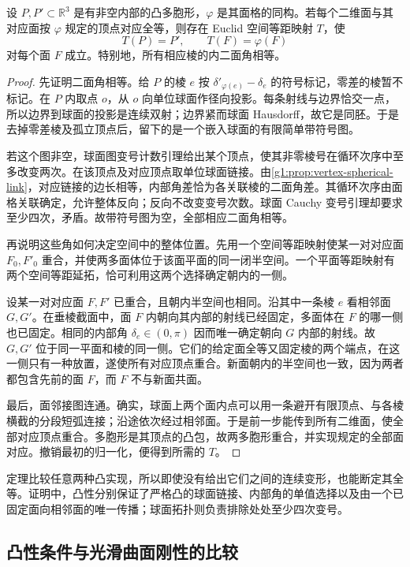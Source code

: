 \begin{theorem}\label{g1:thm:cauchy-convex-rigidity}
	设 \(P,P'\subset\mathbb R^3\) 是有非空内部的凸多胞形，\(\varphi\) 是其面格的同构。若每个二维面与其对应面按 \(\varphi\) 规定的顶点对应全等，则存在 Euclid 空间等距映射 \(T\)，使
	\[
		T(P)=P',\qquad T(F)=\varphi(F)
	\]
	对每个面 \(F\) 成立。特别地，所有相应棱的内二面角相等。
\end{theorem}
\begin{proof}
	先证明二面角相等。给 \(P\) 的棱 \(e\) 按 \(\delta'_{\varphi(e)}-\delta_e\) 的符号标记，零差的棱暂不标记。在 \(P\) 内取点 \(o\)，从 \(o\) 向单位球面作径向投影。每条射线与边界恰交一点，所以边界到球面的投影是连续双射；边界紧而球面 Hausdorff，故它是同胚。于是去掉零差棱及孤立顶点后，留下的是一个嵌入球面的有限简单带符号图。

	若这个图非空，球面图变号计数引理给出某个顶点，使其非零棱号在循环次序中至多改变两次。在该顶点及对应顶点取单位球面链接。由\cref{g1:prop:vertex-spherical-link}，对应链接的边长相等，内部角差恰为各关联棱的二面角差。其循环次序由面格关联确定，允许整体反向；反向不改变变号次数。球面 Cauchy 变号引理却要求至少四次，矛盾。故带符号图为空，全部相应二面角相等。

	再说明这些角如何决定空间中的整体位置。先用一个空间等距映射使某一对对应面 \(F_0,F'_0\) 重合，并使两多面体位于该面平面的同一闭半空间。一个平面等距映射有两个空间等距延拓，恰可利用这两个选择确定朝内的一侧。

	设某一对对应面 \(F,F'\) 已重合，且朝内半空间也相同。沿其中一条棱 \(e\) 看相邻面 \(G,G'\)。在垂棱截面中，面 \(F\) 内朝向其内部的射线已经固定，多面体在 \(F\) 的哪一侧也已固定。相同的内部角 \(\delta_e\in(0,\pi)\) 因而唯一确定朝向 \(G\) 内部的射线。故 \(G,G'\) 位于同一平面和棱的同一侧。它们的给定面全等又固定棱的两个端点，在这一侧只有一种放置，遂使所有对应顶点重合。新面朝内的半空间也一致，因为两者都包含先前的面 \(F\)，而 \(F\) 不与新面共面。

	最后，面邻接图连通。确实，球面上两个面内点可以用一条避开有限顶点、与各棱横截的分段短弧连接；沿途依次经过相邻面。于是前一步能传到所有二维面，使全部对应顶点重合。多胞形是其顶点的凸包，故两多胞形重合，并实现规定的全部面对应。撤销最初的归一化，便得到所需的 \(T\)。
\end{proof}

定理比较任意两种凸实现，所以即使没有给出它们之间的连续变形，也能断定其全等。证明中，凸性分别保证了严格凸的球面链接、内部角的单值选择以及由一个已固定面向相邻面的唯一传播；球面拓扑则负责排除处处至少四次变号。

\subsection{凸性条件与光滑曲面刚性的比较}
\label{g1:subsec:E04:05}


